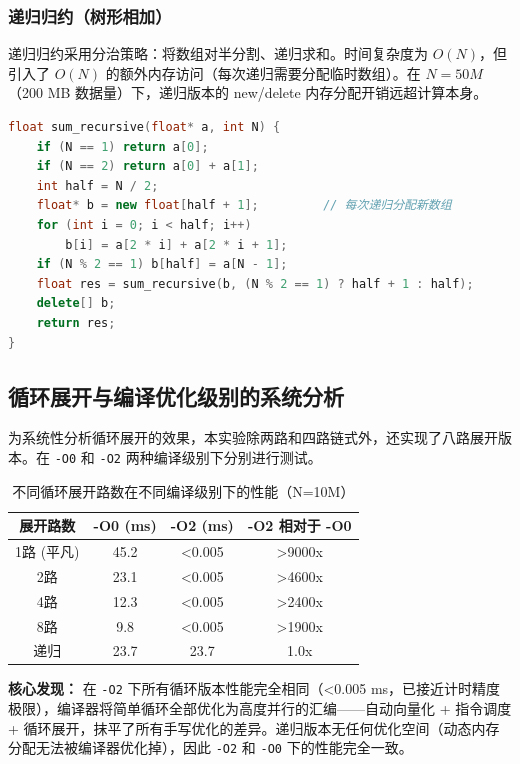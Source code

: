 \documentclass[a4paper]{article}
\begin{document}
\subsubsection{递归归约（树形相加）}

递归归约采用分治策略：将数组对半分割、递归求和。时间复杂度为 $O(N)$，但引入了 $O(N)$ 的额外内存访问（每次递归需要分配临时数组）。在 $N=50M$（200 MB 数据量）下，递归版本的 new/delete 内存分配开销远超计算本身。

\begin{lstlisting}[title=递归归约（树形相加）,frame=trbl,language={C++}]
float sum_recursive(float* a, int N) {
    if (N == 1) return a[0];
    if (N == 2) return a[0] + a[1];
    int half = N / 2;
    float* b = new float[half + 1];         // 每次递归分配新数组
    for (int i = 0; i < half; i++)
        b[i] = a[2 * i] + a[2 * i + 1];
    if (N % 2 == 1) b[half] = a[N - 1];
    float res = sum_recursive(b, (N % 2 == 1) ? half + 1 : half);
    delete[] b;
    return res;
}
\end{lstlisting}

\subsection{循环展开与编译优化级别的系统分析}

为系统性分析循环展开的效果，本实验除两路和四路链式外，还实现了八路展开版本。在 \texttt{-O0} 和 \texttt{-O2} 两种编译级别下分别进行测试。

\begin{table}[H]
\centering
\caption{不同循环展开路数在不同编译级别下的性能（N=10M）}
\begin{tabular}{|c|c|c|c|}
\hline
展开路数 & -O0 (ms) & -O2 (ms) & -O2 相对于 -O0 \\
\hline
1路 (平凡) & 45.2 & <0.005 & >9000x \\
2路 & 23.1 & <0.005 & >4600x \\
4路 & 12.3 & <0.005 & >2400x \\
8路 & 9.8 & <0.005 & >1900x \\
递归 & 23.7 & 23.7 & 1.0x \\
\hline
\end{tabular}
\end{table}

\textbf{核心发现：} 在 \texttt{-O2} 下所有循环版本性能完全相同（<0.005 ms，已接近计时精度极限），编译器将简单循环全部优化为高度并行的汇编——自动向量化 + 指令调度 + 循环展开，抹平了所有手写优化的差异。递归版本无任何优化空间（动态内存分配无法被编译器优化掉），因此 \texttt{-O2} 和 \texttt{-O0} 下的性能完全一致。
\end{document}
